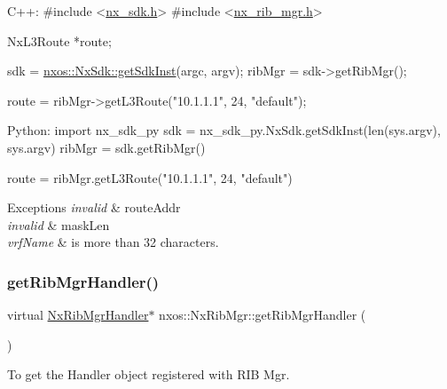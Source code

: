 \begin{DoxyCode}
C++:
\textcolor{preprocessor}{     #include <\mbox{\hyperlink{nx__sdk_8h}{nx\_sdk.h}}>}
\textcolor{preprocessor}{     #include <\mbox{\hyperlink{nx__rib__mgr_8h}{nx\_rib\_mgr.h}}>}

     NxL3Route    *route;

     sdk = \mbox{\hyperlink{classnxos_1_1_nx_sdk_a5050e2d26c40744b4fc7862068a83f39}{nxos::NxSdk::getSdkInst}}(argc, argv);
     ribMgr = sdk->getRibMgr();

     route = ribMgr->getL3Route(\textcolor{stringliteral}{"10.1.1.1"}, 24, \textcolor{stringliteral}{"default"});

Python:
     \textcolor{keyword}{import} nx\_sdk\_py
     sdk = nx\_sdk\_py.NxSdk.getSdkInst(len(sys.argv), sys.argv)
     ribMgr = sdk.getRibMgr()

     route = ribMgr.getL3Route(\textcolor{stringliteral}{"10.1.1.1"}, 24, \textcolor{stringliteral}{"default"})
\end{DoxyCode}



\begin{DoxyExceptions}{Exceptions}
{\em invalid} & route\+Addr \\
\hline
{\em invalid} & mask\+Len \\
\hline
{\em vrf\+Name} & is more than 32 characters. \\
\hline
\end{DoxyExceptions}
\mbox{\label{classnxos_1_1_nx_rib_mgr_aeed917ba912782303662c4009f3fcfcd}} 
\subsubsection{\texorpdfstring{get\+Rib\+Mgr\+Handler()}{getRibMgrHandler()}}
{\footnotesize\ttfamily virtual \mbox{\hyperlink{classnxos_1_1_nx_rib_mgr_handler}{Nx\+Rib\+Mgr\+Handler}}$\ast$ nxos\+::\+Nx\+Rib\+Mgr\+::get\+Rib\+Mgr\+Handler (\begin{DoxyParamCaption}{ }\end{DoxyParamCaption})\hspace{0.3cm}{\ttfamily [pure virtual]}}

To get the Handler object registered with R\+IB Mgr. \mbox{\label{classnxos_1_1_nx_rib_mgr_a605323f1d764bc8c27fe770a9a6b4628}} 
